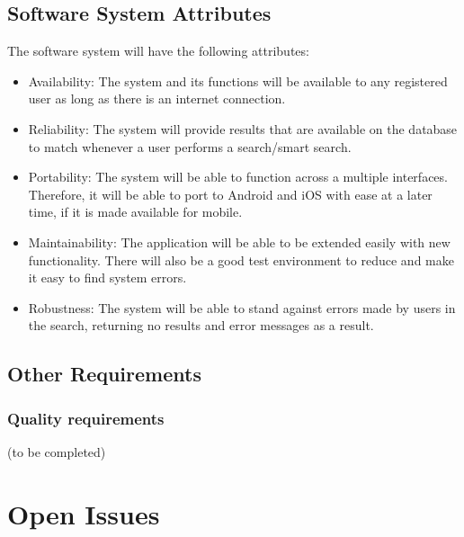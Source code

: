 \documentclass[a4paper,10pt]{article}
\begin{document}
	\subsection{Software System Attributes}
	The software system will have the following attributes:
		\begin{itemize}
		\item Availability: The system and its functions will be available to any registered user as long as there is an internet connection. 
		\item Reliability: The system will provide results that are available on the database to match whenever a user performs a search/smart search.
		\item Portability: The system will be able to function across a multiple interfaces. Therefore, it will be able to port to Android and iOS with ease at a later time, if it is made available for mobile.   
		\item Maintainability: The application will be able to be extended easily with new functionality. There will also be a good test environment to reduce and make it easy to find system errors.  
		\item Robustness: The system will be able to stand against errors made by users in the search, returning no results and error messages as a result.
		\end{itemize}
        
	\subsection{Other Requirements}

\subsubsection{Quality requirements}
(to be completed)




\clearpage

\section{Open Issues}
\end{document}
